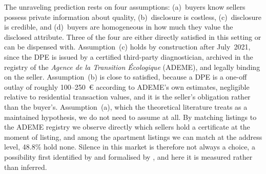 The unraveling prediction rests on four assumptions: (a)~buyers know sellers possess private
information about quality, (b)~disclosure is costless, (c)~disclosure is credible, and
(d)~buyers are homogeneous in how much they value the disclosed attribute. Three of the four are
either directly satisfied in this setting or can be dispensed with. Assumption~(c) holds by
construction after July~2021, since the DPE is issued by a certified third-party diagnostician,
archived in the registry of the \emph{Agence de la Transition \'Ecologique} (ADEME), and legally
binding on the seller. Assumption~(b) is close to satisfied, because a DPE is a one-off outlay of
roughly 100--250~\euro{} according to ADEME's own estimates, negligible relative to
residential transaction values, and it is the seller's obligation rather than the buyer's.
Assumption~(a), which the theoretical literature treats as a maintained hypothesis, we do not
need to assume at all. By matching listings to the ADEME registry we observe directly which
sellers hold a certificate at the moment of listing, and among the apartment listings we can
match at the address level, 48.8\% hold none.
Silence in this market is therefore not always a choice, a possibility first identified by
\citet{dye_disclosure_1985} and formalised by \citet{jung_kwon_1988}, and here it is measured
rather than inferred.
